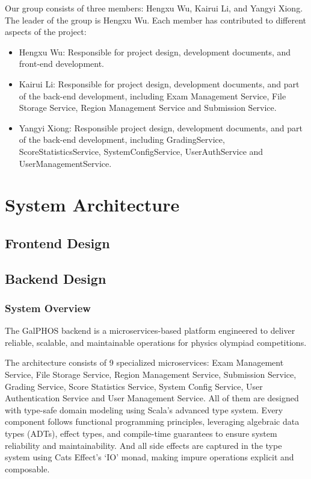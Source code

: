 \documentclass[12pt]{article}
\begin{document}
Our group consists of three members: Hengxu Wu, Kairui Li, and Yangyi Xiong. The leader of the group is Hengxu Wu. Each member has contributed to different aspects of the project:
\begin{itemize}
    \item Hengxu Wu: Responsible for project design, development documents, and front-end development.
    \item Kairui Li: Responsible for project design, development documents, and part of the back-end development, including Exam Management Service, File Storage Service, Region Management Service and Submission Service.
    \item Yangyi Xiong: Responsible project design, development documents, and part of the back-end development, including GradingService, ScoreStatisticsService, SystemConfigService, UserAuthService and UserManagementService.
\end{itemize}

\section{System Architecture}
\subsection{Frontend Design}
\subsection{Backend Design}

\subsubsection{System Overview}

The GalPHOS backend is a microservices-based platform engineered to deliver reliable, scalable, and maintainable operations for physics olympiad competitions. 

The architecture consists of 9 specialized microservices: Exam Management Service, File Storage Service, Region Management Service, Submission Service, Grading Service, Score Statistics Service, System Config Service, User Authentication Service and User Management Service. All of them are designed with type-safe domain modeling using Scala's advanced type system. Every component follows functional programming principles, leveraging algebraic data types (ADTs), effect types, and compile-time guarantees to ensure system reliability and maintainability. And all side effects are captured in the type system using Cats Effect's `IO' monad, making impure operations explicit and composable.
\end{document}
